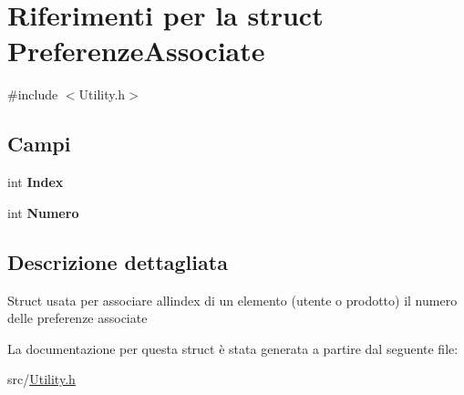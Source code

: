 \hypertarget{struct_preferenze_associate}{}\section{Riferimenti per la struct Preferenze\+Associate}
\label{struct_preferenze_associate}


{\ttfamily \#include $<$Utility.\+h$>$}

\subsection*{Campi}
\begin{DoxyCompactItemize}
\item 
\mbox{\label{struct_preferenze_associate_a75786e0086d85610ef918d312329a913}} 
int {\bfseries Index}
\item 
\mbox{\label{struct_preferenze_associate_a82f570f079a3dd9ade07a9b5c52c8eb7}} 
int {\bfseries Numero}
\end{DoxyCompactItemize}


\subsection{Descrizione dettagliata}
Struct usata per associare all\textquotesingle{}index di un elemento (utente o prodotto) il numero delle preferenze associate 

La documentazione per questa struct è stata generata a partire dal seguente file\+:\begin{DoxyCompactItemize}
\item 
src/\hyperlink{_utility_8h}{Utility.\+h}\end{DoxyCompactItemize}
